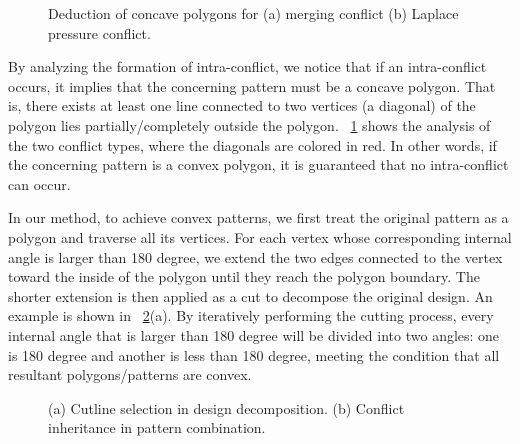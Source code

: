 \begin{figure}[t]
	\fontsize{14}{14}  \selectfont
	\centerline{\resizebox{8.5cm}{!}{}}
	\caption{Deduction of concave polygons for (a) merging conflict (b) Laplace pressure conflict.}
	\label{fig:concave}
	\normalsize
\end{figure}

By analyzing the formation of intra-conflict,
we notice that if an intra-conflict occurs,
it implies that the concerning pattern must be a concave polygon.
That is, there exists at least one line connected to two vertices (a diagonal) of the polygon lies partially/completely outside the polygon.
\figurename~\ref{fig:concave} shows the analysis of the two conflict types,
where the diagonals are colored in red.
In other words, if the concerning pattern is a convex polygon,
it is guaranteed that no intra-conflict can occur.


In our method, to achieve convex patterns,
we first treat the original pattern as a polygon and traverse all its vertices.
For each vertex whose corresponding internal angle is larger than 180 degree,
we extend the two edges connected to the vertex toward the inside of the polygon until they reach the polygon boundary.
The shorter extension is then applied as a cut to decompose the original design.
An example is shown in \figurename~\ref{fig:cut_combine}(a).
By iteratively performing the cutting process,
every internal angle that is larger than 180 degree will be divided into two angles:
one is 180 degree and another is less than 180 degree,
meeting the condition that all resultant polygons/patterns are convex.

\begin{figure}[t]
	\fontsize{14}{14}  \selectfont
	\centerline{\resizebox{8.5cm}{!}{}}
	\caption{(a) Cutline selection in design decomposition. (b) Conflict inheritance in pattern combination.}
	\label{fig:cut_combine}
	\normalsize
\end{figure}


